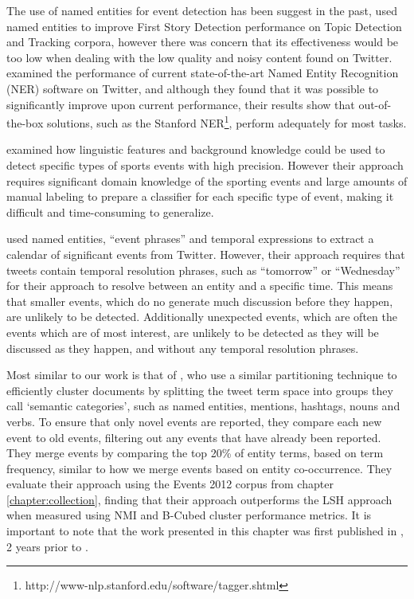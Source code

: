 The use of named entities for event detection has been suggest in the past,  \cite{Kumaran:2004:TCN:1008992.1009044} used named entities to improve First Story Detection performance on Topic Detection and Tracking corpora, however there was concern that its effectiveness would be too low when dealing with the low quality and noisy content found on Twitter. \cite{DBLP:conf/sigir/LiWHYDSL12} examined the performance of current state-of-the-art Named Entity Recognition (NER) software on Twitter, and although they found that it was possible to significantly improve upon current performance, their results show that out-of-the-box solutions, such as the Stanford NER\footnote{http://www-nlp.stanford.edu/software/tagger.shtml}, perform adequately for most tasks.

\cite{Choudhury11extractingsemantic} examined how linguistic features and background knowledge could be used to detect specific types of sports events with high precision. However their approach requires significant domain knowledge of the sporting events and large amounts of manual labeling to prepare a classifier for each specific type of event, making it difficult and time-consuming to generalize.

\cite{Ritter:2012:ODE:2339530.2339704} used named entities, ``event phrases'' and temporal expressions to extract a calendar of significant events from Twitter.
However, their approach requires that tweets contain temporal resolution phrases, such as ``tomorrow'' or ``Wednesday'' for their approach to resolve between an entity and a specific time.
This means that smaller events, which do no generate much discussion before they happen, are unlikely to be detected. Additionally unexpected events, which are often the events which are of most interest, are unlikely to be detected as they will be discussed as they happen, and without any temporal resolution phrases.

Most similar to our work is that of \cite{Reuters2017}, who use a similar partitioning technique to efficiently cluster documents by splitting the tweet term space into groups they call `semantic categories', such as named entities, mentions, hashtags, nouns and verbs.
To ensure that only novel events are reported, they compare each new event to old events, filtering out any events that have already been reported.
They merge events by comparing the top 20\% of entity terms, based on term frequency, similar to how we merge events based on entity co-occurrence.
They evaluate their approach using the Events 2012 corpus from chapter \ref{chapter:collection}, finding that their approach outperforms the LSH approach when measured using NMI and B-Cubed cluster performance metrics.
It is important to note that the work presented in this chapter was first published in \cite{McMinn15}, 2 years prior to \cite{Reuters2017}.